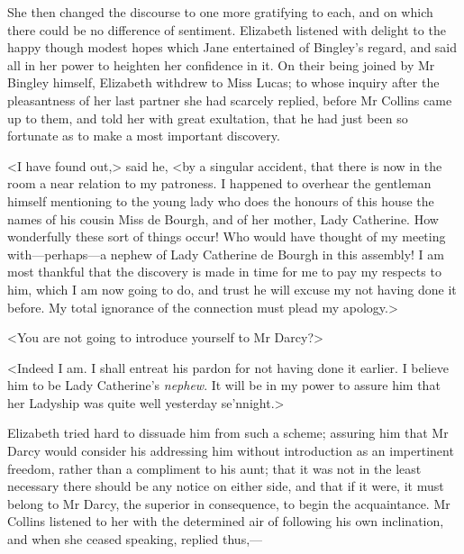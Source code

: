 She then changed the discourse to one more gratifying to each, and on which there could be no difference of sentiment. Elizabeth listened with delight to the happy though modest hopes which Jane entertained of Bingley's regard, and said all in her power to heighten her confidence in it. On their being joined by Mr Bingley himself, Elizabeth withdrew to Miss Lucas; to whose inquiry after the pleasantness of her last partner she had scarcely replied, before Mr Collins came up to them, and told her with great exultation, that he had just been so fortunate as to make a most important discovery.

<I have found out,> said he, <by a singular accident, that there is now in the room a near relation to my patroness. I happened to overhear the gentleman himself mentioning to the young lady who does the honours of this house the names of his cousin Miss de Bourgh, and of her mother, Lady Catherine. How wonderfully these sort of things occur! Who would have thought of my meeting with—perhaps—a nephew of Lady Catherine de Bourgh in this assembly! I am most thankful that the discovery is made in time for me to pay my respects to him, which I am now going to do, and trust he will excuse my not having done it before. My total ignorance of the connection must plead my apology.>

<You are not going to introduce yourself to Mr Darcy?>

<Indeed I am. I shall entreat his pardon for not having done it earlier. I believe him to be Lady Catherine's \textit{nephew}. It will be in my power to assure him that her Ladyship was quite well yesterday se'nnight.>

Elizabeth tried hard to dissuade him from such a scheme; assuring him that Mr Darcy would consider his addressing him without introduction as an impertinent freedom, rather than a compliment to his aunt; that it was not in the least necessary there should be any notice on either side, and that if it were, it must belong to Mr Darcy, the superior in consequence, to begin the acquaintance. Mr Collins listened to her with the determined air of following his own inclination, and when she ceased speaking, replied thus,—

